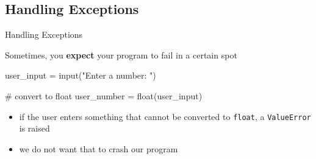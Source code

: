 \subsection{Handling Exceptions}

\begin{frame}[fragile]{Handling Exceptions}

    \begin{block}{}
        Sometimes, you \textbf{expect} your program to fail in a certain spot
    \end{block}

    \begin{pythoncode}
    user_input  = input("Enter a number: ")

    # convert to float
    user_number = float(user_input)
    \end{pythoncode}

    \vspace{1em}

    \begin{itemize}
        \item if the user enters something that cannot be converted to \texttt{float}, a \texttt{ValueError} is raised
        \item we do not want that to crash our program
    \end{itemize}


\end{frame}

